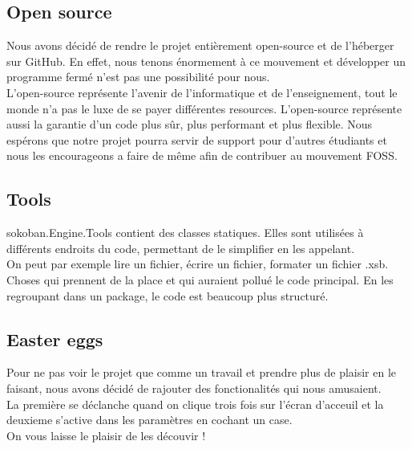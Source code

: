 \documentclass[../main.tex]{subfiles}
\begin{document}
\subsection{Open source}
Nous avons décidé de rendre le projet entièrement open-source et de l'héberger sur GitHub. 
En effet, nous tenons énormement à ce mouvement et développer un programme fermé n'est pas une possibilité pour nous. \\

L'open-source représente l'avenir de l'informatique et de l'enseignement, tout le monde n'a pas le luxe de se payer différentes resources.
L'open-source représente aussi la garantie d'un code plus sûr, plus performant et plus flexible.
Nous espérons que notre projet pourra servir de support pour d'autres étudiants et nous les encourageons a faire de même 
afin de contribuer au mouvement FOSS.

\subsection{Tools}
sokoban.Engine.Tools contient des classes statiques. Elles sont utilisées à différents endroits du code, permettant de le simplifier en les appelant. \\

On peut par exemple lire un fichier, écrire un fichier, formater un fichier .xsb. Choses qui prennent de la place et qui auraient pollué le code principal. En les regroupant dans un package, le code est beaucoup plus structuré.

\subsection{Easter eggs}
Pour ne pas voir le projet que comme un travail et prendre plus de plaisir en le faisant, nous avons décidé de rajouter des fonctionalités qui nous amusaient. \\
La première se déclanche quand on clique trois fois sur l'écran d'acceuil et la deuxieme s'active dans les paramètres en cochant un case. \\
On vous laisse le plaisir de les découvir !

\newpage
\end{document}
